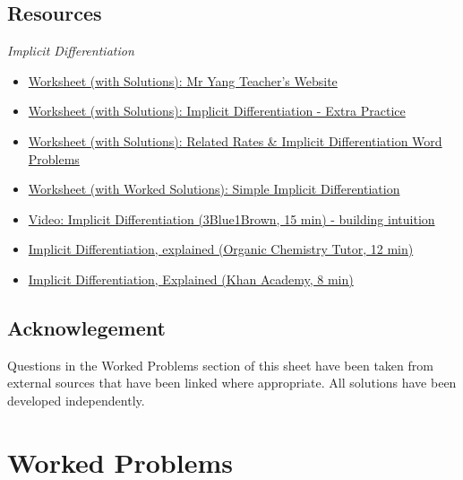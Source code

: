 \documentclass{article}
\begin{document}
\subsection*{Resources}
\textit{Implicit Differentiation}
\begin{itemize}
    \item \href{https://mryangteacher.weebly.com/uploads/7/7/0/2/7702250/2.5_implicit_practice_ws_1.pdf}{Worksheet (with Solutions): Mr Yang Teacher's Website}

    \item \href{https://www.livingston.org/cms/lib9/NJ01000562/Centricity/Domain/742/calc/TC%20-%20Ch%202.7%20Implicit%20Diff%20Extra%20practice.pdf}{Worksheet (with Solutions): Implicit Differentiation - Extra Practice}

    \item \href{https://2.files.edl.io/pdSOxxrMpkCv2wYTkIQc8sBeAKmj0f908f6Y4bfnHFzzNkgU.pdf}{Worksheet (with Solutions): Related Rates \& Implicit Differentiation Word Problems}

    \item \href{https://www.cbsd.org/cms/lib/PA01916442/Centricity/Domain/2035/Calc_WS_IMP_DIFF_ans.pdf}{Worksheet (with Worked Solutions): Simple Implicit Differentiation}

    \item \href{https://youtu.be/qb40J4N1fa4}{Video: Implicit Differentiation (3Blue1Brown, 15 min) - building intuition}

    \item \href{https://youtu.be/LGY-DjFsALc}{Implicit Differentiation, explained (Organic Chemistry Tutor, 12 min)}

    \item \href{https://www.khanacademy.org/math/ap-calculus-ab/ab-differentiation-2-new/ab-3-2/v/implicit-differentiation-1}{Implicit Differentiation, Explained (Khan Academy, 8 min)}

\end{itemize}
\subsection*{Acknowlegement}
Questions in the Worked Problems section of this sheet have been taken from external sources that have been linked where appropriate. All solutions have been developed independently. 

\pagebreak
\section*{Worked Problems}
\label{WorkedProblems}
\end{document}
